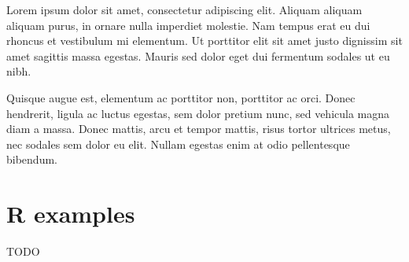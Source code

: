 Lorem ipsum dolor sit amet, consectetur adipiscing elit. Aliquam aliquam aliquam purus, in ornare nulla imperdiet molestie. Nam tempus erat eu dui rhoncus et vestibulum mi elementum. Ut porttitor elit sit amet justo dignissim sit amet sagittis massa egestas. Mauris sed dolor eget dui fermentum sodales ut eu nibh.

Quisque augue est, elementum ac porttitor non, porttitor ac orci. Donec hendrerit, ligula ac luctus egestas, sem dolor pretium nunc, sed vehicula magna diam a massa. Donec mattis, arcu et tempor mattis, risus tortor ultrices metus, nec sodales sem dolor eu elit. Nullam egestas enim at odio pellentesque bibendum. 

\clearpage
{}
\chapter{R examples}
TODO

